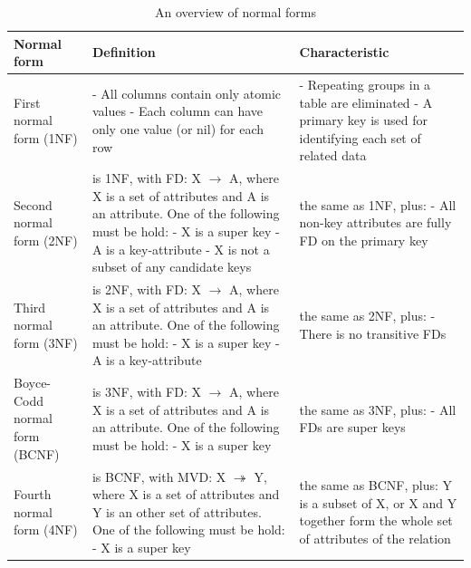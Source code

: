 \begin{table}[ht]
\begin{center}
\begin{tabular}{ |p{3cm}||p{5cm}|p{5cm}|  }
 \hline
 Normal form& Definition& Characteristic\\
 \hline
 First normal form (1NF)&- All columns contain only atomic values\newline
 - Each column can have only one value (or nil) for each row&- Repeating groups in a table are eliminated\newline
 - A primary key is used for identifying each set of related data\\
 \hline
 Second normal form (2NF)&is 1NF, with FD: X $\rightarrow$ A, where X is a set of attributes and A is an attribute. One of the following must be hold:\newline
 - X is a super key\newline
 - A is a key-attribute\newline
 - X is not a subset of any candidate keys&the same as 1NF, plus:\newline
 - All non-key attributes are fully FD on the primary key\\
 \hline
 Third normal form (3NF)&is 2NF, with FD: X $\rightarrow$ A, where X is a set of attributes and A is an attribute. One of the following must be hold:\newline
 - X is a super key\newline
 - A is a key-attribute&the same as 2NF, plus:\newline
 - There is no transitive FDs\\
 \hline
 Boyce-Codd normal form (BCNF)&is 3NF, with FD: X $\rightarrow$ A, where X is a set of attributes and A is an attribute. One of the following must be hold:\newline
 - X is a super key&the same as 3NF, plus:\newline
 - All FDs are super keys\\
 \hline
 Fourth normal form (4NF) &is BCNF, with MVD: X $\twoheadrightarrow$ Y, where X is a set of attributes and Y is an other set of attributes. One of the following must be hold:\newline
 - X is a super key&the same as BCNF, plus:\newline
 Y is a subset of X, or X and Y together form the whole set of attributes of the relation\\
 \hline
\end{tabular}
\end{center}
\caption{An overview of normal forms}
\label{tab:FamousNF}
\end{table}
